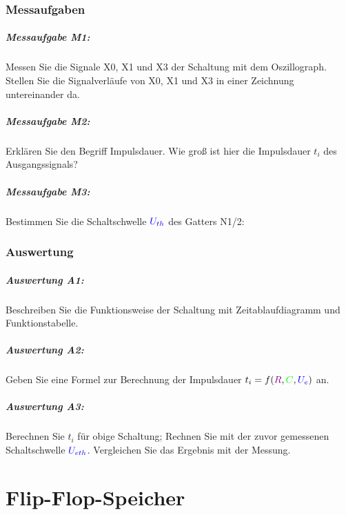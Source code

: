 \documentclass[11pt,a4paper,titlepage,parskip=half]{scrreprt}
\begin{document}
      \subsection{Messaufgaben}
        \paragraph{Messaufgabe M1:} Messen Sie die Signale X0, X1 und X3 der Schaltung mit dem Oszillograph. Stellen Sie die Signalverläufe von X0, X1 und X3 in einer Zeichnung untereinander da.

        \paragraph{Messaufgabe M2:} Erklären Sie den Begriff Impulsdauer. Wie groß ist hier die Impulsdauer $t_i$ des Ausgangssignals?

        \paragraph{Messaufgabe M3:} Bestimmen Sie die Schaltschwelle $\textcolor{blue}{U_{th}}$ des Gatters N1/2:

      \subsection{Auswertung}
        \paragraph{Auswertung A1:} Beschreiben Sie die Funktionsweise der Schaltung mit Zeitablaufdiagramm und Funktionstabelle.
        
          
        \paragraph{Auswertung A2:} Geben Sie eine Formel zur Berechnung der Impulsdauer $t_i = f(\textcolor{violet}{R}, \textcolor{green}{C}, \textcolor{blue}{U_e})$ an.

        \paragraph{Auswertung A3:} Berechnen Sie $t_i$ für obige Schaltung; Rechnen Sie mit der zuvor gemessenen
          Schaltschwelle $\textcolor{blue}{U_{eth}}$. Vergleichen Sie das Ergebnis mit der Messung.

        
  \chapter{Flip-Flop-Speicher}
\end{document}
